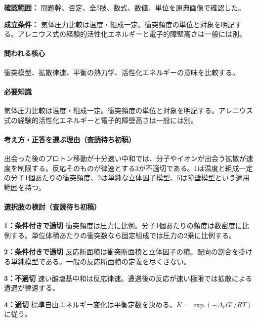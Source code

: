 \noindent\textbf{確認範囲：} 問題幹、否定、全5肢、数式、数値、単位を原典画像で確認した。\par

\noindent\textbf{成立条件：} 気体圧力比較は温度・組成一定。衝突頻度の単位と対象を明記する。アレニウス式の経験的活性化エネルギーと電子的障壁高さは一般には別。\par

\paragraph{問われる核心} 衝突模型、拡散律速、平衡の熱力学、活性化エネルギーの意味を比較する。

\paragraph{必要知識} 気体圧力比較は温度・組成一定。衝突頻度の単位と対象を明記する。アレニウス式の経験的活性化エネルギーと電子的障壁高さは一般には別。

\paragraph{考え方・正答を選ぶ理由（査読待ち初稿）} 出会った後のプロトン移動が十分速い中和では、分子やイオンが出会う拡散が速度を制限する。反応そのものが律速とする3が不適切である。1は温度と組成一定の分子1個あたりの衝突頻度、2は単純な立体因子模型、5は障壁模型という適用範囲を持つ。

\paragraph{選択肢の検討（査読待ち初稿）}\mbox{}\par

\noindent\textbf{1：条件付きで適切} 衝突頻度は圧力に比例。分子1個あたりの頻度は数密度に比例する。単位体積あたりの衝突数なら固定組成では圧力の2乗に比例する。\par

\noindent\textbf{2：条件付きで適切} 反応断面積は衝突断面積と立体因子の積。配向の割合を掛ける単純模型である。一般の反応断面積の定義を尽くさない。\par

\noindent\textbf{3：不適切} 速い酸塩基中和は反応律速。遭遇後の反応が速い極限では拡散による遭遇が律速する。\par

\noindent\textbf{4：適切} 標準自由エネルギー変化は平衡定数を決める。\(K=\exp(-\Delta_rG^\circ/RT)\) に従う。\par

